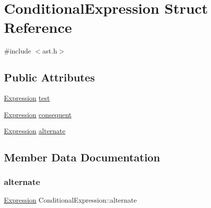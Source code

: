 \hypertarget{struct_conditional_expression}{}\section{Conditional\+Expression Struct Reference}
\label{struct_conditional_expression}


{\ttfamily \#include $<$ast.\+h$>$}

\subsection*{Public Attributes}
\begin{DoxyCompactItemize}
\item 
\hyperlink{ast_8h_a4cb273a4d960cd13ea17d08f254493e8}{Expression} \hyperlink{struct_conditional_expression_a85dee3d7e20a322d152a5f9185177488}{test}
\item 
\hyperlink{ast_8h_a4cb273a4d960cd13ea17d08f254493e8}{Expression} \hyperlink{struct_conditional_expression_a86d872949d197c61b09c06f663dec654}{consequent}
\item 
\hyperlink{ast_8h_a4cb273a4d960cd13ea17d08f254493e8}{Expression} \hyperlink{struct_conditional_expression_ad958635584dff634101113e63166e0a2}{alternate}
\end{DoxyCompactItemize}


\subsection{Member Data Documentation}
\mbox{\label{struct_conditional_expression_ad958635584dff634101113e63166e0a2}} 
\subsubsection{\texorpdfstring{alternate}{alternate}}
{\footnotesize\ttfamily \hyperlink{ast_8h_a4cb273a4d960cd13ea17d08f254493e8}{Expression} Conditional\+Expression\+::alternate}

\mbox{\label{struct_conditional_expression_a86d872949d197c61b09c06f663dec654}} 
